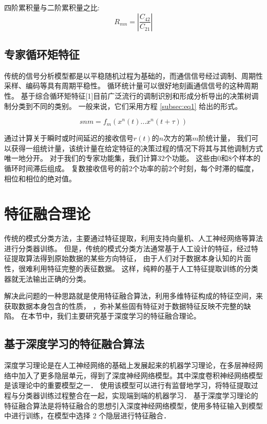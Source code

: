 四阶累积量与二阶累积量之比:
\begin{equation}
R_{mn} = |\frac{C_{42}}{C_{21}}|
\end{equation}
 

\subsection{专家循环矩特征}

传统的信号分析模型都是以平稳随机过程为基础的，而通信信号经过调制、周期性采样、编码等具有周期平稳性。
循环统计量可以很好地刻画通信信号的这种周期性。
基于综合循环矩特征[1]目前广泛流行的调制识别和形成分析导出的决策树调制分类到不同的类别。 
一般来说，它们采用方程 \ref{subsec:eq1} 给出的形式。

\begin{equation}
\label{subsec:eq1}
snm = f_{m}(x^{n}(t)...x^{n}(t + \tau))
\end{equation}

通过计算关于瞬时或时间延迟的接收信号$r(t)$的$n$次方的第$m$阶统计量，
我们可以获得一组统计量，该统计量在给定特征的决策过程的情况下将其与其他调制方式唯一地分开。 
对于我们的专家功能集，我们计算32个功能。 这些由0和8个样本的循环时间滞后组成。 
复数接收信号的前2个功率的前2个时刻，每个时滞的幅度，相位和相位的绝对值。\par


\section{特征融合理论}
传统的模式分类方法，主要通过特征提取，利用支持向量机、人工神经网络等算法进行分类器训练。 
但是，传统的模式分类方法通常基于人工设计的特征，经过特征提取算法得到原始数据的某些方向特征，
由于人们对于数据本身认知的片面性，很难利用特征完整的表征数据。
这样，纯粹的基于人工特征提取训练的分类器就无法输出正确的分类。\par

解决此问题的一种思路就是使用特征融合算法，利用多维特征构成的特征空间，来获取数据本身包含的性质，
，弥补某些固有特征对于数据特征反映不完整的缺陷。
在本节中，我们主要研究基于深度学习的特征融合理论。\par

\subsection{基于深度学习的特征融合算法}

深度学习理论是在人工神经网络的基础上发展起来的机器学习理论，在多层神经网络中加入了更多隐层单元，得到了深度神经网络模型。其中深度卷积神经网络模型是该理论中的重要模型之一． 使用该模型可以进行有监督地学习，将特征提取过程与分类器训练过程整合在一起，实现端到端的机器学习． 基于深度学习理论的特征融合算法是将特征融合的思想引入深度神经网络模型，使用多特征输入到模型中进行训练，在模型中选择 2 个隐层进行特征融合．


